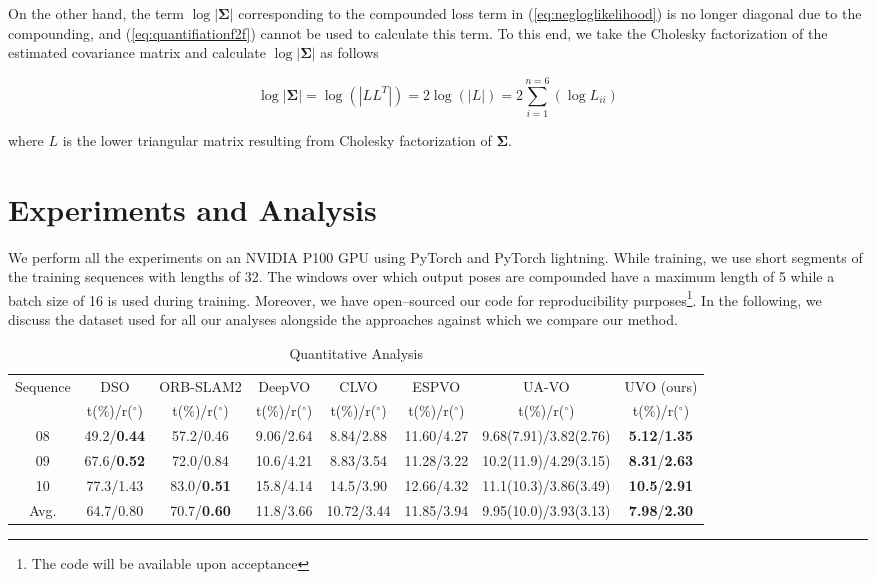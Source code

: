 \documentclass[letterpaper, 10 pt]{ieeeconf}  %
\begin{document}
On the other hand, the term $\log{|\boldsymbol{\Sigma}|}$ corresponding to the compounded loss term in (\ref{eq:negloglikelihood}) is no longer diagonal due to the compounding, and (\ref{eq:quantifiationf2f}) cannot be used to calculate this term. To this end, we take the Cholesky factorization of the estimated covariance matrix and calculate $\log{|\boldsymbol{\Sigma}|}$ as follows

\begin{equation}
\log{|\boldsymbol{\Sigma}|}=\log(|LL^T|) = 2\log(|L|) = 2\sum_{i=1}^{n=6}(\log{L_{i i}})
\label{eq:quantifiationcompounded}
\end{equation}

where $L$ is the lower triangular matrix resulting from Cholesky factorization of $\boldsymbol{\Sigma}$.

\section{Experiments and Analysis}
\label{sec:results}
We perform all the experiments on an NVIDIA P100 GPU using PyTorch and PyTorch lightning. While training, we use short segments of the training sequences with lengths of 32. The windows over which output poses are compounded have a maximum length of 5 while a batch size of 16 is used during training. Moreover, we have open--sourced our code for reproducibility  purposes\footnote{The code will be available upon acceptance}. In the following, we discuss the dataset used for all our analyses alongside the approaches against which we compare our method.

\begin{table*}[!t]
    \centering
    \caption{Quantitative Analysis}
    \begin{tabular}{c|cc|cccc|c} \toprule
        \multirow{2}{*}{Sequence} & {DSO \cite{engel2017direct}} & {ORB-SLAM2 \cite{mur2017orb}} & {DeepVO \cite{wang2017deepvo}} & {CLVO \cite{saputra2019learning}} & {ESPVO \cite{wang2018end}} & {UA-VO \cite{costante2020uncertainty}} & {UVO (ours)} \\
        & {t(\%)/r($^\circ$)} & {t(\%)/r($^\circ$)} & {t(\%)/r($^\circ$)} & {t(\%)/r($^\circ$)} & {t(\%)/r($^\circ$)} & {t(\%)/r($^\circ$)} & {t(\%)/r($^\circ$)}\\\midrule
        08 & 49.2/\textbf{0.44} & 57.2/0.46 & 9.06/2.64 & 8.84/2.88 & 11.60/4.27 & 9.68(7.91)/3.82(2.76) & \textbf{5.12}/\textbf{1.35}\\
        09 & 67.6/\textbf{0.52} & 72.0/0.84 & 10.6/4.21 & 8.83/3.54 & 11.28/3.22  & 10.2(11.9)/4.29(3.15) & \textbf{8.31}/\textbf{2.63} \\
        10 & 77.3/1.43 & 83.0/\textbf{0.51} & 15.8/4.14 & 14.5/3.90 & 12.66/4.32  & 11.1(10.3)/3.86(3.49) & \textbf{10.5}/\textbf{2.91}\\ \midrule
        Avg. & 64.7/0.80 & 70.7/\textbf{0.60} & 11.8/3.66 & 10.72/3.44  & 11.85/3.94   & 9.95(10.0)/3.93(3.13) & \textbf{7.98}/\textbf{2.30} \\ \bottomrule
    \end{tabular}
    \label{tab:pathquantiative}
\end{table*}
\end{document}
